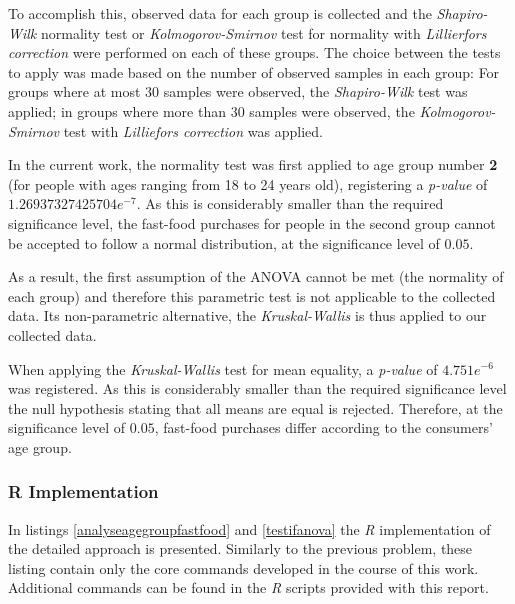 \documentclass[12pt]{article}
\begin{document}
To accomplish this, observed data for each group is collected and the \emph{Shapiro-Wilk} normality test or \emph{Kolmogorov-Smirnov} test for normality with \emph{Lillierfors correction} were performed on each of these groups. The choice between the tests to apply was made based on the number of observed samples in each group: For groups where at most $30$ samples were observed, the \emph{Shapiro-Wilk} test was applied; in groups where more than $30$ samples were observed, the \emph{Kolmogorov-Smirnov} test with \emph{Lilliefors correction} was applied.

In the current work, the normality test was first applied to age group number \textbf{2} (for people with ages ranging from 18 to 24 years old), registering a \emph{p-value} of $1.26937327425704e^{-7}$. As this is considerably smaller than the required significance level, the fast-food purchases for people in the second group cannot be accepted to follow a normal distribution, at the significance level of $0.05$.

As a result, the first assumption of the ANOVA cannot be met (the normality of each group) and therefore this parametric test is not applicable to the collected data. Its non-parametric alternative, the \emph{Kruskal-Wallis} is thus applied to our collected data.

When applying the \emph{Kruskal-Wallis} test for mean equality, a \emph{p-value} of $4.751e^{-6}$ was registered. As this is considerably smaller than the required significance level the null hypothesis stating that all means are equal is rejected. Therefore, at the significance level of $0.05$, fast-food purchases differ according to the consumers' age group.

\subsubsection{R Implementation}

In listings \ref{analyseagegroupfastfood} and \ref{testifanova} the \emph{R} implementation of the detailed approach is presented. Similarly to the previous problem, these listing contain only the core commands developed in the course of this work. Additional commands can be found in the \emph{R} scripts provided with this report.
\end{document}
